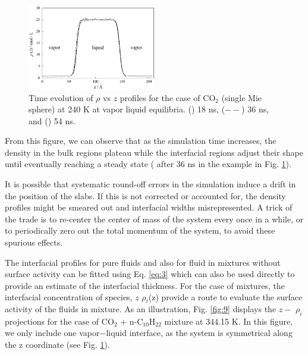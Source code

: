 \documentclass[9pt,tutorial]{livecoms}
\begin{document}
\begin{figure}
\includegraphics[width=0.5\textwidth]{gfx/Fig_14_2.jpeg}
\caption{Time evolution of {${\rho}$} vs $z$ profiles for the case of CO$_{2}$ (single Mie sphere) at 240 K at vapor \textendash{} liquid equilibria. ({\textbullet}{\textbullet}{\textbullet}) 18 ns, (${-}{-}$) 36 ns, and (\textemdash) 54 ns.}
\label{fig:8}
\end{figure}

From this figure, we can observe that as the simulation time increases, the
density in the bulk regions plateau while the interfacial regions adjust their
shape until eventually reaching a steady state ( after 36 ns in the example in
Fig. \ref{fig:8}). 

It is possible that systematic round-off errors in the simulation induce a drift
in the position of the slabs. If this is not corrected or accounted for, the
density profiles might be smeared out and interfacial widths misrepresented.
A trick of the trade is to re-center the center of mass of the system every
once in a while, or to periodically zero out the total momentum of the system,
to avoid these spurious effects.

The interfacial profiles for pure fluids and also for fluid in mixtures without
surface activity can be fitted using Eq. \ref{eq:3} which can also be used directly to
provide an estimate of the interfacial thickness. For the case of mixtures, the
interfacial concentration of species, $z$ \textendash{}
{${\rho}$}$_{i}$(z) provide a route to evaluate the surface activity of the
fluids in mixture. As an illustration, Fig. \ref{fig:9} displays the $z{-}$
${\rho}_{i}$ projections for the case of CO$_{2}$ + n-C$_{10}$H$_{22}$
mixture at 344.15 K. In this figure, we only include one vapor${-}$liquid
interface, as the system is symmetrical along the z coordinate (see Fig. \ref{fig:8}). 
\end{document}

